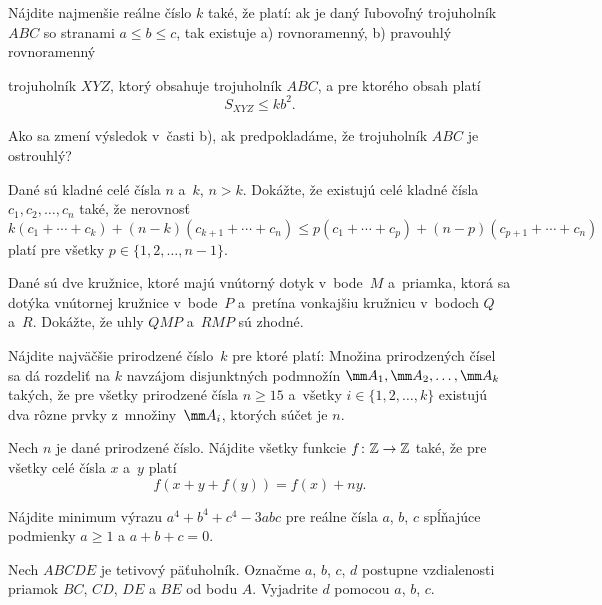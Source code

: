 {%
Nájdite najmenšie reálne číslo $k$ také, že platí: ak je daný ľubovoľný trojuholník $ABC$ so stranami $a \le b \le c$, tak existuje
\ite a) rovnoramenný,
\ite b) pravouhlý rovnoramenný

trojuholník $XYZ$, ktorý obsahuje trojuholník $ABC$, a pre ktorého obsah platí
$$
S_{XYZ} \le kb^2.
$$

Ako sa zmení výsledok v~časti b), ak predpokladáme, že trojuholník $ABC$ je ostrouhlý?
}

{%
Dané sú kladné celé čísla $n$ a~$k$, $n > k$. Dokážte, že existujú celé kladné čísla $c_1, c_2, \dots, c_n$ také, že nerovnosť
$$
k(c_1 + \cdots + c_k) + (n-k) (c_{k+1} + \cdots +c_n) \le
p(c_1 + \cdots + c_p) + (n-p) (c_{p+1} + \cdots + c_n)
$$
platí pre všetky $p \in \{ 1, 2, \dots, n-1\}$.}

{%
Dané sú dve kružnice, ktoré majú vnútorný dotyk v~bode~$M$ a~priamka, ktorá sa dotýka vnútornej kružnice v~bode~$P$ a~pretína vonkajšiu kružnicu v~bodoch $Q$ a~$R$. Dokážte, že uhly $QMP$ a~$RMP$ sú zhodné.
}

{%
Nájdite najväčšie prirodzené číslo~$k$ pre ktoré platí: Množina prirodzených čísel sa dá rozdeliť na $k$ navzájom disjunktných podmnožín $\mm A_1,\mm A_2,\dots, \mm A_k$ takých, že pre všetky prirodzené čísla $n\ge15$ a~všetky $i\in\{1,2,\dots,k\}$ existujú dva rôzne prvky z~množiny~$\mm A_i$, ktorých súčet je $n$.
}

{%
Nech $n$ je dané prirodzené číslo. Nájdite všetky funkcie $f\colon\Bbb Z\to\Bbb Z$ také, že pre všetky celé čísla $x$ a~$y$ platí
$$
f(x+y+f(y))=f(x)+ny.
$$
}

{%
Nájdite minimum výrazu $a^4+b^4+c^4-3abc$ pre reálne čísla $a$, $b$, $c$ spĺňajúce podmienky $a\ge 1$ a $a+b+c=0$.
}

{%
Nech $ABCDE$ je tetivový päťuholník. Označme $a$, $b$, $c$, $d$ postupne vzdialenosti priamok $BC$, $CD$, $DE$ a $BE$ od bodu $A$. Vyjadrite $d$ pomocou $a$, $b$, $c$.}


